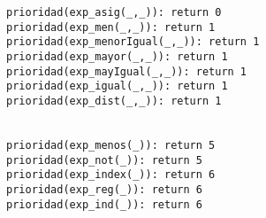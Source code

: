 \begin{lstlisting}
prioridad(exp_asig(_,_)): return 0
prioridad(exp_men(_,_)): return 1
prioridad(exp_menorIgual(_,_)): return 1
prioridad(exp_mayor(_,_)): return 1
prioridad(exp_mayIgual(_,_)): return 1
prioridad(exp_igual(_,_)): return 1
prioridad(exp_dist(_,_)): return 1


prioridad(exp_menos(_)): return 5
prioridad(exp_not(_)): return 5
prioridad(exp_index(_)): return 6
prioridad(exp_reg(_)): return 6
prioridad(exp_ind(_)): return 6




\end{lstlisting}